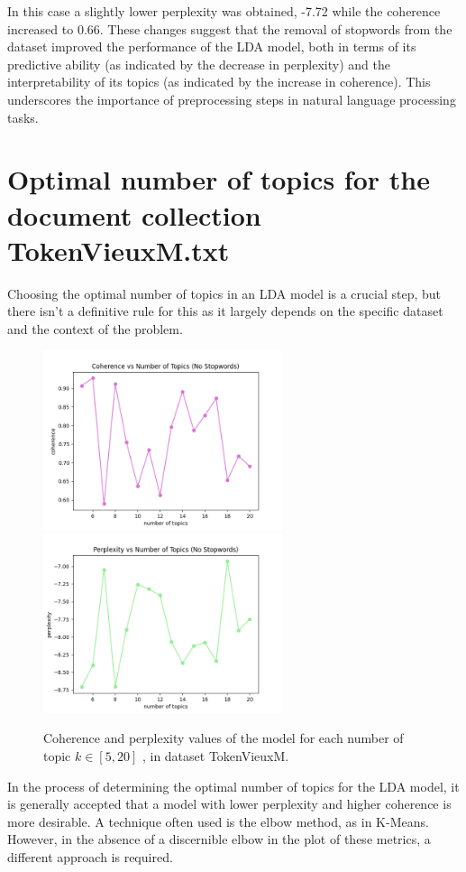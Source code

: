 \documentclass[10pt]{article} %
\begin{document}
	In this case a slightly lower perplexity was obtained, -7.72 while the coherence increased to 0.66. These changes suggest that the removal of stopwords from the dataset improved the performance of the LDA model, both in terms of its predictive ability (as indicated by the decrease in perplexity) and the interpretability of its topics (as indicated by the increase in coherence). This underscores the importance of preprocessing steps in natural language processing tasks.
	
	\section{Optimal number of topics for the document collection TokenVieuxM.txt}
	
	Choosing the optimal number of topics in an LDA model is a crucial step, but there isn't a definitive rule for this as it largely depends on the specific dataset and the context of the problem. 
	
	\begin{figure}[H]
	\centering
		\includegraphics[width=7cm]{images/coherence_no_stopwords_diff_n_topics}
		\includegraphics[width=7cm]{images/perplexity_no_stopwords_diff_n_topics}
	\caption{Coherence and perplexity values of the model for each number of topic $k \in [5, 20]$ , in dataset TokenVieuxM.}
\end{figure}
	
	In the process of determining the optimal number of topics for the LDA model, it is generally accepted that a model with lower perplexity and higher coherence is more desirable. A technique often used is the elbow method, as in K-Means. However, in the absence of a discernible elbow in the plot of these metrics, a different approach is required.
	
\end{document}
